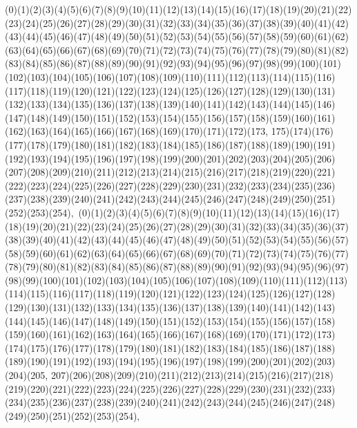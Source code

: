 \documentclass[12pt]{article}
\begin{document}
{(0)(1)(2)(3)(4)(5)(6)(7)(8)(9)(10)(11)(12)(13)(14)(15)(16)(17)(18)(19)(20)(21)(22)(23)(24)(25)(26)(27)(28)(29)(30)(31)(32)(33)(34)(35)(36)(37)(38)(39)(40)(41)(42)(43)(44)(45)(46)(47)(48)(49)(50)(51)(52)(53)(54)(55)(56)(57)(58)(59)(60)(61)(62)(63)(64)(65)(66)(67)(68)(69)(70)(71)(72)(73)(74)(75)(76)(77)(78)(79)(80)(81)(82)(83)(84)(85)(86)(87)(88)(89)(90)(91)(92)(93)(94)(95)(96)(97)(98)(99)(100)(101)(102)(103)(104)(105)(106)(107)(108)(109)(110)(111)(112)(113)(114)(115)(116)(117)(118)(119)(120)(121)(122)(123)(124)(125)(126)(127)(128)(129)(130)(131)(132)(133)(134)(135)(136)(137)(138)(139)(140)(141)(142)(143)(144)(145)(146)(147)(148)(149)(150)(151)(152)(153)(154)(155)(156)(157)(158)(159)(160)(161)(162)(163)(164)(165)(166)(167)(168)(169)(170)(171)(172)(173, 175)(174)(176)(177)(178)(179)(180)(181)(182)(183)(184)(185)(186)(187)(188)(189)(190)(191)(192)(193)(194)(195)(196)(197)(198)(199)(200)(201)(202)(203)(204)(205)(206)(207)(208)(209)(210)(211)(212)(213)(214)(215)(216)(217)(218)(219)(220)(221)(222)(223)(224)(225)(226)(227)(228)(229)(230)(231)(232)(233)(234)(235)(236)(237)(238)(239)(240)(241)(242)(243)(244)(245)(246)(247)(248)(249)(250)(251)(252)(253)(254)$
, 
$
(0)(1)(2)(3)(4)(5)(6)(7)(8)(9)(10)(11)(12)(13)(14)(15)(16)(17)(18)(19)(20)(21)(22)(23)(24)(25)(26)(27)(28)(29)(30)(31)(32)(33)(34)(35)(36)(37)(38)(39)(40)(41)(42)(43)(44)(45)(46)(47)(48)(49)(50)(51)(52)(53)(54)(55)(56)(57)(58)(59)(60)(61)(62)(63)(64)(65)(66)(67)(68)(69)(70)(71)(72)(73)(74)(75)(76)(77)(78)(79)(80)(81)(82)(83)(84)(85)(86)(87)(88)(89)(90)(91)(92)(93)(94)(95)(96)(97)(98)(99)(100)(101)(102)(103)(104)(105)(106)(107)(108)(109)(110)(111)(112)(113)(114)(115)(116)(117)(118)(119)(120)(121)(122)(123)(124)(125)(126)(127)(128)(129)(130)(131)(132)(133)(134)(135)(136)(137)(138)(139)(140)(141)(142)(143)(144)(145)(146)(147)(148)(149)(150)(151)(152)(153)(154)(155)(156)(157)(158)(159)(160)(161)(162)(163)(164)(165)(166)(167)(168)(169)(170)(171)(172)(173)(174)(175)(176)(177)(178)(179)(180)(181)(182)(183)(184)(185)(186)(187)(188)(189)(190)(191)(192)(193)(194)(195)(196)(197)(198)(199)(200)(201)(202)(203)(204)(205, 207)(206)(208)(209)(210)(211)(212)(213)(214)(215)(216)(217)(218)(219)(220)(221)(222)(223)(224)(225)(226)(227)(228)(229)(230)(231)(232)(233)(234)(235)(236)(237)(238)(239)(240)(241)(242)(243)(244)(245)(246)(247)(248)(249)(250)(251)(252)(253)(254)$
, 
$
}
\end{document}
